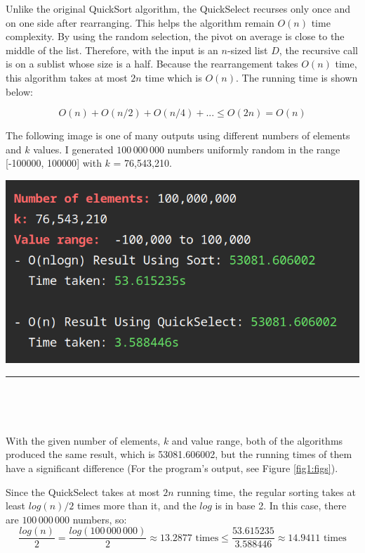\documentclass[12pt,english,]{article}
\let\origfigure\figure
\let\endorigfigure\endfigure
\renewenvironment{figure}[1][2] {
    \expandafter\origfigure\expandafter[H]
} {
    \endorigfigure
}
\begin{document}
Unlike the original QuickSort algorithm, the QuickSelect recurses only
once and on one side after rearranging. This helps the algorithm remain
\(O(n)\) time complexity. By using the random selection, the pivot on
average is close to the middle of the list. Therefore, with the input is
an \(n\)-sized list \(D\), the recursive call is on a sublist whose size
is a half. Because the rearrangement takes \(O(n)\) time, this algorithm
takes at most \(2n\) time which is \(O(n)\). The running time is shown
below:

\[O(n) + O(n/2) + O(n/4) +... \leq O(2n) = O(n)\]

The following image is one of many outputs using different numbers of
elements and \(k\) values. I generated \(100\,000\,000\) numbers
uniformly random in the range {[}-100000, 100000{]} with \(k\) =
76,543,210.

\begin{figure}

{\centering \includegraphics[width=0.7\linewidth]{./images_&_data/kth_smallest/100m} 

}

\caption{\label{fig1:figs}The outputs of the $O(NlogN)$ algorithm using regular sorting and the $O(n)$ QuickSelect algorithm that recurses only once.}\label{fig:unnamed-chunk-1}
\end{figure}

\hrule

~

~

With the given number of elements, \(k\) and value range, both of the
algorithms produced the same result, which is 53081.606002, but the
running times of them have a significant difference (For the program's
output, see Figure \ref{fig1:figs}).

Since the QuickSelect takes at most \(2n\) running time, the regular
sorting takes at least \(log(n)/2\) times more than it, and the \(log\)
is in base 2. In this case, there are \(100\,000\,000\) numbers, so:
\[\frac{log(n)}{2} = \frac{log(100\,000\,000)}{2} \approx 13.2877 \text{ times} \leq \frac{53.615235}{3.588446} \approx 14.9411 \text{ times}\]
\end{document}
